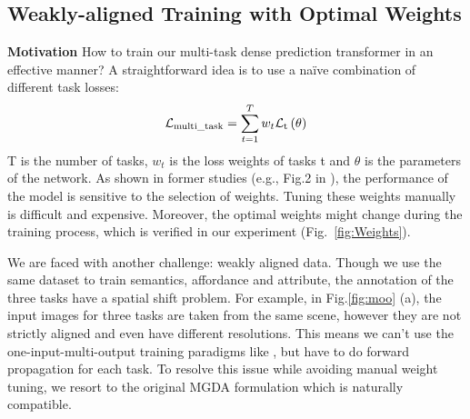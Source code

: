 \documentclass[10pt,twocolumn,letterpaper]{article}
\begin{document}
\subsection{Weakly-aligned Training with Optimal Weights}

\textbf{Motivation} How to train our multi-task dense prediction transformer in an effective manner? A straightforward idea is to use a naïve combination of different task losses:
\begin{align}
\mathcal{L}_{\rm multi\_task} = \sum_{t=1}^{T}w_t \mathcal{L}_{\rm t} \left(\theta\right)
\end{align}
T is the number of tasks, $w_t$ is the loss weights of tasks t and $\theta$ is the parameters of the network. As shown in former studies (e.g., Fig.2 in \cite{kendall2018multi}), the performance of the model is sensitive to the selection of weights. Tuning these weights manually is difficult and expensive. Moreover, the optimal weights might change during the training process, which is verified in our experiment (Fig.~\ref{fig:Weights}).

We are faced with another challenge: weakly aligned data. Though we use the same dataset to train semantics, affordance and attribute, the annotation of the three tasks have a spatial shift problem. For example, in Fig.\ref{fig:moo} (a), the input images for three tasks are taken from the same scene, however they are not strictly aligned and even have different resolutions. This means we can't use the one-input-multi-output training paradigms like \cite{sener2018multi}, but have to do forward propagation for each task. To resolve this issue while avoiding manual weight tuning, we resort to the original MGDA formulation \cite{desideri2012multiple} which is naturally compatible.
\end{document}

